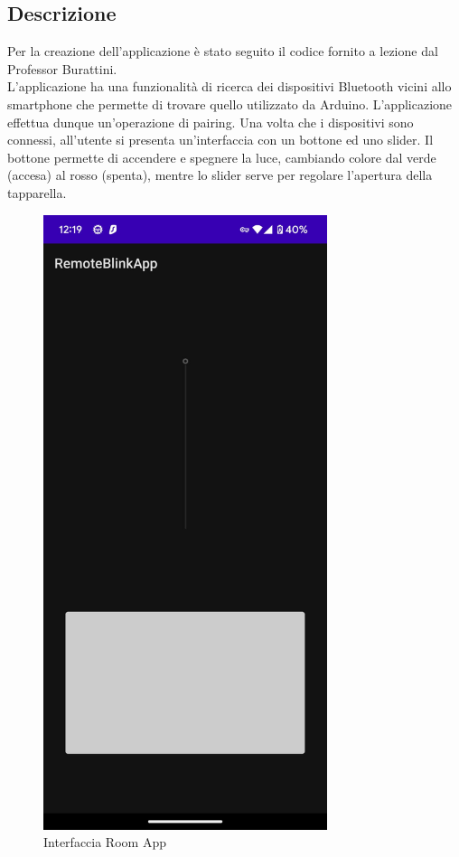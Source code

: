 \documentclass[12pt]{article}
\begin{document}
\subsection{Descrizione}
Per la creazione dell’applicazione è stato seguito il codice fornito a lezione dal Professor Burattini.\\
L’applicazione ha una funzionalità di ricerca dei dispositivi Bluetooth vicini allo smartphone che permette di trovare quello utilizzato da Arduino. L'applicazione effettua dunque un’operazione di pairing. Una volta che i dispositivi sono connessi, all’utente si presenta un’interfaccia con un bottone ed uno slider. Il bottone permette di accendere e spegnere la luce, cambiando colore dal verde (accesa) al rosso (spenta), mentre lo slider serve per regolare l'apertura della tapparella.\\
\begin{figure}[H]
    \includegraphics[height=18cm]{mobile-app.jpeg}
    \centering
    \caption{Interfaccia Room App}
\end{figure}
\end{document}
